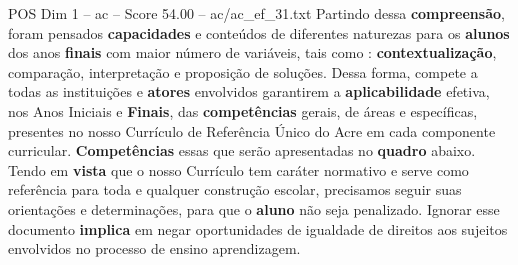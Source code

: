 \begin{textsample}{POS Dim 1 – ac – Score 54.00 – ac/ac\_ef\_31.txt}
Partindo dessa \textbf{compreensão}, foram pensados \textbf{capacidades} e conteúdos de diferentes naturezas para os \textbf{alunos} dos anos \textbf{finais} com maior número de variáveis, tais como : \textbf{contextualização}, comparação, interpretação e proposição de soluções.
Dessa forma, compete a todas as instituições e \textbf{atores} envolvidos garantirem a \textbf{aplicabilidade} efetiva, nos Anos Iniciais e \textbf{Finais}, das \textbf{competências} gerais, de áreas e específicas, presentes no nosso Currículo de Referência Único do Acre em cada componente curricular. \textbf{Competências} essas que serão apresentadas no \textbf{quadro} abaixo.
Tendo em \textbf{vista} que o nosso Currículo tem caráter normativo e serve como referência para toda e qualquer construção escolar, precisamos seguir suas orientações e determinações, para que o \textbf{aluno} não seja penalizado.
Ignorar esse documento \textbf{implica} em negar oportunidades de igualdade de direitos aos sujeitos envolvidos no processo de ensino aprendizagem.

\end{textsample}
